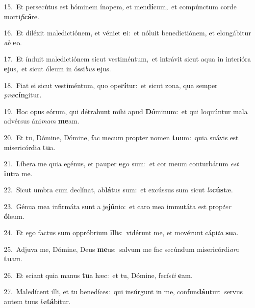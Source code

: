 {\numbfont\textcolor{\numbcolor}{15.}}~Et persecútus est hóminem ínopem, et men\-\textbf{dí}\-cum,~\star et compúnctum corde morti\-\textit{fi}\-\textbf{cá}re.\par
{\numbfont\textcolor{\numbcolor}{16.}}~Et diléxit maledictiónem, et véniet \textbf{e}\-i:~\star et nóluit benedictiónem, et elongábitur \textit{ab} \textbf{e}\-o.\par
{\numbfont\textcolor{\numbcolor}{17.}}~Et índuit maledictiónem sicut vestiméntum,~\dagger et intrávit sicut aqua in interióra \textbf{e}\-jus,~\star et sicut óleum in óssi\textit{bus} \textbf{e}\-jus.\par
{\numbfont\textcolor{\numbcolor}{18.}}~Fiat ei sicut vestiméntum, quo ope\-\textbf{rí}\-tur:~\star et sicut zona, qua semper \textit{præ}\-\textbf{cín}gitur.\par
{\numbfont\textcolor{\numbcolor}{19.}}~Hoc opus eórum, qui détrahunt mihi apud \textbf{Dó}\-minum:~\star et qui loquúntur mala advérsus áni\textit{mam} \textbf{me}\-am.\par
{\numbfont\textcolor{\numbcolor}{20.}}~Et tu, Dómine, Dómine, fac mecum propter nomen \textbf{tu}\-um:~\star quia suávis est misericórdi\textit{a} \textbf{tu}\-a.\par
{\numbfont\textcolor{\numbcolor}{21.}}~Líbera me quia egénus, et pauper \textbf{e}\-go sum:~\star et cor meum conturbátum \textit{est} \textbf{in}\-tra me.\par
{\numbfont\textcolor{\numbcolor}{22.}}~Sicut umbra cum declínat, ab\-\textbf{lá}\-tus sum:~\star et excússus sum sicut \textit{lo}\-\textbf{cús}tæ.\par
{\numbfont\textcolor{\numbcolor}{23.}}~Génua mea infirmáta sunt a je\-\textbf{jú}\-nio:~\star et caro mea immutáta est prop\textit{ter} \textbf{ó}\-leum.\par
{\numbfont\textcolor{\numbcolor}{24.}}~Et ego factus sum oppróbrium \textbf{il}\-lis:~\star vidérunt me, et movérunt cápi\textit{ta} \textbf{su}\-a.\par
{\numbfont\textcolor{\numbcolor}{25.}}~Adjuva me, Dómine, Deus \textbf{me}\-us:~\star salvum me fac secúndum misericórdi\textit{am} \textbf{tu}\-am.\par
{\numbfont\textcolor{\numbcolor}{26.}}~Et sciant quia manus \textbf{tu}\-a hæc:~\star et tu, Dómine, fecís\textit{ti} \textbf{e}\-am.\par
{\numbfont\textcolor{\numbcolor}{27.}}~Maledícent illi, et tu benedíces:~\dagger qui insúrgunt in me, confun\-\textbf{dán}\-tur:~\star servus autem tuus \textit{læ}\-\textbf{tá}bitur.\par
